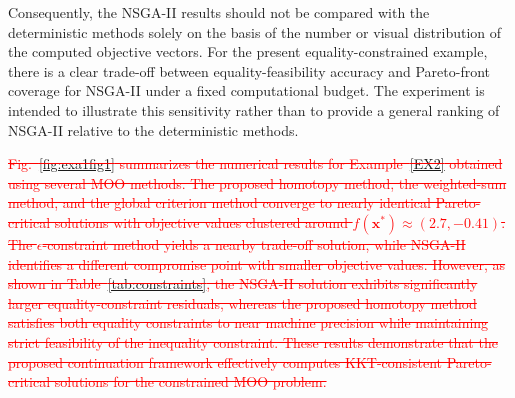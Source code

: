 \documentclass[11pt,pdflatex,sn-mathphys-ay]{sn-jnl}%
\theoremstyle{definition}
\theoremstyle{thmstyleone}%
\theoremstyle{thmstyletwo}%
\theoremstyle{thmstylethree}%
\newcommand{\del}[1]{\textcolor{red}{\sout{#1}}}
\newcommand{\add}[1]{\textcolor{revisionblue}{#1}}
\begin{document}
	\add{Consequently, the NSGA-II results should not be compared with the
		deterministic methods solely on the basis of the number or visual
		distribution of the computed objective vectors. For the present
		equality-constrained example, there is a clear trade-off between
		equality-feasibility accuracy and Pareto-front coverage for NSGA-II
		under a fixed computational budget. The experiment is intended to
		illustrate this sensitivity rather than to provide a general ranking
		of NSGA-II relative to the deterministic methods.
	}
	
	
	\del{Fig.~\ref{fig:exa1fig1} summarizes the numerical results for Example~\ref{EX2} obtained using several MOO methods. The proposed homotopy method, the weighted-sum method, and the global criterion method converge to nearly identical Pareto-critical solutions with objective values clustered around \(f(\bm{x}^*) \approx (2.7,-0.41)\). The $\epsilon$-constraint method yields a nearby trade-off solution, while NSGA-II identifies a different compromise point with smaller objective values. However, as shown in Table~\ref{tab:constraints}, the NSGA-II solution exhibits significantly larger equality-constraint residuals, whereas the proposed homotopy method satisfies both equality constraints to near machine precision while maintaining strict feasibility of the inequality constraint. These results demonstrate that the proposed continuation framework effectively computes KKT-consistent Pareto-critical solutions for the constrained MOO problem.}
	
	
	
\end{document}
